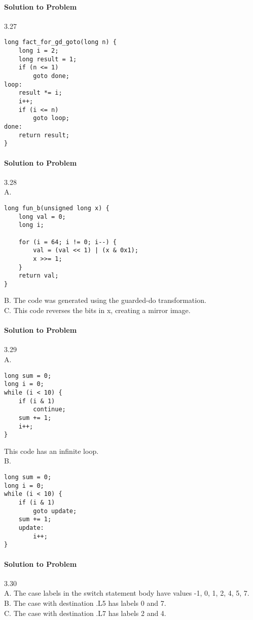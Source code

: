 \documentclass{report}
\begin{document}
\paragraph{Solution to Problem } 3.27 \\
\begin{lstlisting}
long fact_for_gd_goto(long n) {
    long i = 2;
    long result = 1;
    if (n <= 1) 
        goto done;
loop:
    result *= i;
    i++;
    if (i <= n)
        goto loop;
done:
    return result;
}
\end{lstlisting}

\paragraph{Solution to Problem } 3.28 \\
A. 
\begin{lstlisting}
long fun_b(unsigned long x) {
    long val = 0;
    long i;
    
    for (i = 64; i != 0; i--) {
        val = (val << 1) | (x & 0x1);
        x >>= 1;
    }
    return val;
}
\end{lstlisting}
B. The code was generated using the guarded-do transformation. \\
C. This code reverses the bits in x, creating a mirror image.

\paragraph{Solution to Problem } 3.29 \\
A. 
\begin{lstlisting}
long sum = 0;
long i = 0;
while (i < 10) {
    if (i & 1) 
        continue;
    sum += 1;
    i++;
}
\end{lstlisting}
This code has an infinite loop. \\
B.
\begin{lstlisting}
long sum = 0;
long i = 0;
while (i < 10) {
    if (i & 1)
        goto update;
    sum += 1;
    update:
        i++;
}
\end{lstlisting}

\paragraph{Solution to Problem } 3.30 \\
A. The case labels in the switch statement body have values -1, 0, 1, 2, 4, 5, 7. \\
B. The case with destination .L5 has labels 0 and 7. \\
C. The case with destination .L7 has labels 2 and 4.
\end{document}
